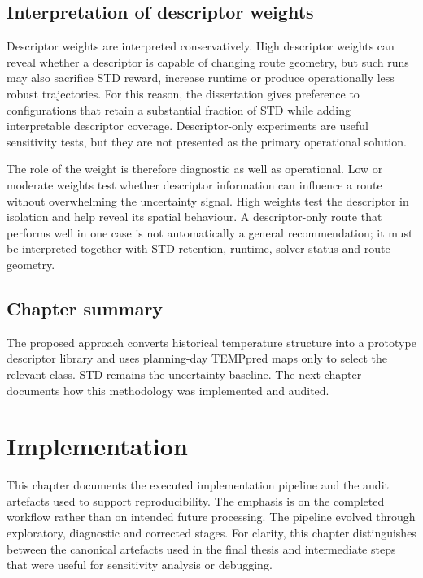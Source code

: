 \section{Interpretation of descriptor weights}

Descriptor weights are interpreted conservatively. High descriptor weights can reveal whether a descriptor is capable of changing route geometry, but such runs may also sacrifice STD reward, increase runtime or produce operationally less robust trajectories. For this reason, the dissertation gives preference to configurations that retain a substantial fraction of STD while adding interpretable descriptor coverage. Descriptor-only experiments are useful sensitivity tests, but they are not presented as the primary operational solution.

The role of the weight is therefore diagnostic as well as operational. Low or moderate weights test whether descriptor information can influence a route without overwhelming the uncertainty signal. High weights test the descriptor in isolation and help reveal its spatial behaviour. A descriptor-only route that performs well in one case is not automatically a general recommendation; it must be interpreted together with STD retention, runtime, solver status and route geometry.

\section{Chapter summary}

The proposed approach converts historical temperature structure into a prototype descriptor library and uses planning-day TEMPpred maps only to select the relevant class. STD remains the uncertainty baseline. The next chapter documents how this methodology was implemented and audited.


\chapter{Implementation} \label{chap:implementation}

This chapter documents the executed implementation pipeline and the audit artefacts used to support reproducibility. The emphasis is on the completed workflow rather than on intended future processing. The pipeline evolved through exploratory, diagnostic and corrected stages. For clarity, this chapter distinguishes between the canonical artefacts used in the final thesis and intermediate steps that were useful for sensitivity analysis or debugging.

